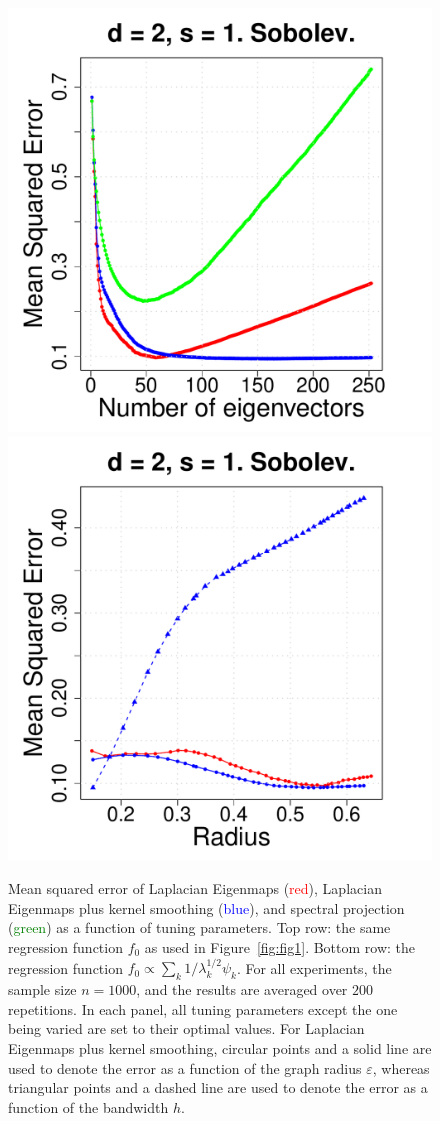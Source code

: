 \documentclass{article}
\newcommand{\1}{\mathbf{1}}
\theoremstyle{alden}
\theoremstyle{aldenthm}
\theoremstyle{definition}
\theoremstyle{remark}
\begin{document}
\begin{figure}[tb]
	\includegraphics[width=.245\textwidth]{figures/tuning/sobolev/mse_by_number_of_eigenvectors_2d_1s.pdf}
	\includegraphics[width=.245\textwidth]{figures/tuning/sobolev/mse_by_radius_2d_1s.pdf}  
	\caption{Mean squared error of Laplacian Eigenmaps (\textcolor{red}{red}), Laplacian Eigenmaps plus kernel smoothing (\textcolor{blue}{blue}), and spectral projection (\textcolor{green}{green}) as a function of tuning parameters. Top row: the same regression function $f_0$ as used in Figure~\ref{fig:fig1}. Bottom row: the regression function $f_0 \propto \sum_{k} 1/\lambda_k^{1/2} \psi_k$. For all experiments, the sample size $n = 1000$, and the results are averaged over $200$ repetitions. In each panel, all tuning parameters except the one being varied are set to their optimal values. For Laplacian Eigenmaps plus kernel smoothing, circular points and a solid line are used to denote the error as a function of the graph radius $\varepsilon$, whereas triangular points and a dashed line are used to denote the error as a function of the bandwidth $h$.}
	\label{fig:fig3}
\end{figure}



\end{document}
